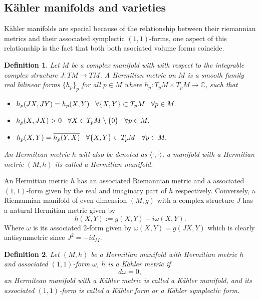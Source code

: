 \documentclass[letterpaper]{book}
\newtheorem{definition}{Definition}[section]
\newcommand{\co}{\ensuremath{\mathbb C }}
\begin{document}
\subsection{Kähler manifolds and varieties}
Kähler manifolds are special because of the relationship between their riemannian metrics and their associated symplectic $(1,1)$-forms, one aspect of this relationship is the fact that both both asociated volume forms coincide.
\begin{definition}
        Let $M$ be a complex manifold with with respect to the integrable complex structure
        $J:TM\rightarrow TM$. A \textit{Hermitian metric} on $M$ is a smooth family
        real bilinear forms $\lbrace h_p\rbrace_p$ for all $p\in M$ where
        $h_p:T_pM\times T_pM\rightarrow\co$, such that
\begin{itemize}
        \item $h_p(JX,JY)=h_p(X,Y)\hspace{0.3cm}\forall\lbrace X,Y\rbrace\subset T_pM\hspace{0.3cm}\forall p\in M.$
        \item $h_p(X,JX)>0\hspace{0.3cm}\forall X\in T_p M\setminus\lbrace 0\rbrace\hspace{0.3cm}\forall p\in M.$
        \item $h_p(X,Y)=\overline{h_p(Y,X)}\hspace{0.3cm}\forall\lbrace X,Y\rbrace\subset T_pM\hspace{0.3cm}\forall p\in M.$
\end{itemize}
An Hermitean metric $h$ will also be denoted as $\langle\cdot,\cdot\rangle$, a manifold with a Hermitian metric $(M,h)$ its called a \textit{Hermitian manifold}.
\end{definition}
An Hermitian metric $h$ has an associated Riemannian metric and a associated $(1,1)$-form given by the real and
imaginary part of $h$ respectively. Conversely, a Riemannian manifold of even dimension $(M,g)$ with a complex structure $J$ has
a natural Hermitian metric given by
\[
  h(X,Y):=g(X,Y)-i\omega(X,Y).
\]
\noindent Where $\omega$ is its associated 2-form given by $\omega(X,Y)=g(JX,Y)$ which is clearly antisymmetric since $J^2=-id_M$.
\begin{definition}
        Let $(M,h)$ be a Hermitian manifold with Hermitian metric $h$ and associated $(1,1)$-form $\omega$, $h$ is a Kähler metric if
        \[
          d\omega=0,
        \]
        \noindent an Hermitean manifold with a Kähler metric is called a \textit{Kähler manifold}, and its associated $(1,1)$-form is  called a \textit{Kähler form} or a \textit{Kähler symplectic form}.
\end{definition}
\end{document}

